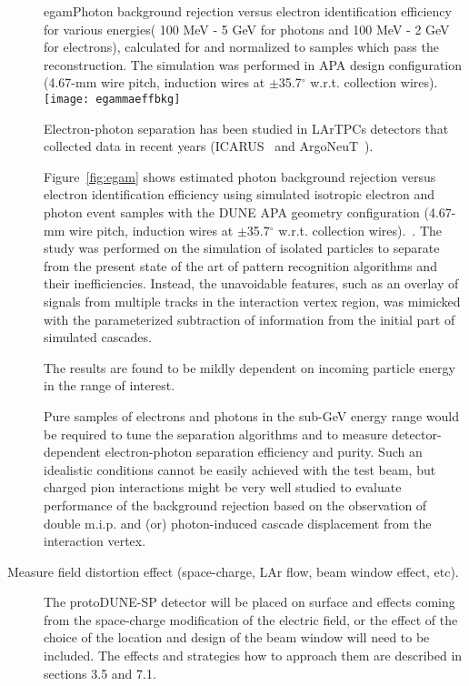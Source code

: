 \begin{description}
\begin{cdrfigure}{egam}{Photon background rejection versus electron identification efficiency for various energies( 100 MeV - 5 GeV for photons and 100 MeV - 2 GeV for electrons), calculated for and normalized to samples which pass the reconstruction.  The simulation was performed in APA design configuration (4.67-mm wire pitch, induction wires at $\pm$35.7$^{\circ}$ w.r.t. collection wires).}
\texttt{[image: egammaeffbkg]}
\end{cdrfigure}


Electron-photon separation has been studied in LArTPCs  detectors that collected data in recent years (ICARUS~\cite{icarus_eg} and ArgoNeuT~\cite{argoneut_eg}).

Figure~\ref{fig:egam} shows estimated photon background rejection versus electron identification efficiency using simulated isotropic electron and photon event samples with the DUNE APA geometry configuration (4.67-mm wire pitch,
induction wires at $\pm$35.7$^{\circ}$ w.r.t. collection wires).~\cite{dunecdr}. The study was performed on the
simulation of isolated particles to separate from the present state of the art of pattern recognition algorithms
and their inefficiencies. Instead, the unavoidable features, such as an overlay of signals from multiple tracks in the
interaction vertex region, was mimicked with the parameterized subtraction of information from the initial part of
simulated cascades.

The results are found to be mildly dependent on incoming particle energy in the range of interest. 


Pure samples of electrons and photons in the sub-GeV energy range would be required to tune the separation algorithms and to measure detector-dependent electron-photon separation efficiency and purity. 
Such an idealistic conditions cannot be easily achieved with the test beam, but charged pion interactions might be very well studied to evaluate performance of the background rejection
based on the observation of double m.i.p. and (or) photon-induced cascade displacement from
the interaction vertex.

\item [Measure field distortion effect (space-charge, LAr flow, beam window effect, etc).] 

The protoDUNE-SP detector will be placed on surface and effects coming from the space-charge modification of the electric field, or the effect of the choice of the location and design of the beam window will need to be included. The effects and strategies how to approach them are described in sections 3.5 and 7.1.



\end{description}
